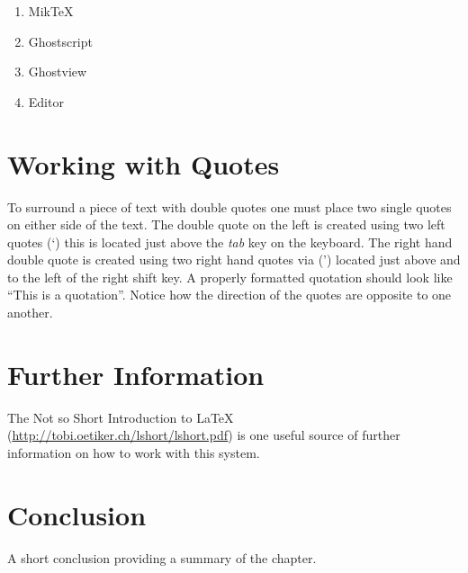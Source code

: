 \begin{enumerate}
  \item MikTeX
  \item Ghostscript
  \item Ghostview
  \item Editor
\end{enumerate}

\section{Working with Quotes}
To surround a piece of text with double quotes one must place two single quotes on either side of the text. The double quote on the left is created using two left quotes (\lq) this is located just above the \emph{tab} key on the keyboard. The right hand double quote is created using two right hand quotes via (\rq) located just above and to the left of the right shift key. A properly formatted quotation should look like ``This is a quotation''. Notice how the direction of the quotes are opposite to one another.

\section{Further Information}
The Not so Short Introduction to LaTeX (\url{http://tobi.oetiker.ch/lshort/lshort.pdf}) is one useful source of further information on how to work with this system.

\section{Conclusion}
A short conclusion providing a summary of the chapter.
